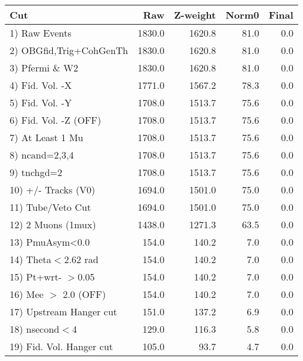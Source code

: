  \begin{table}[h!]\centering
 \begin{tabular}{||l||r|r|r|r||}
 \hline
 \hline
 Cut & Raw & Z-weight & Norm0 & Final \\
 \hline
  1) Raw Events           &      1830.0 &      1620.8 &        81.0 &         0.0 \\
  2) OBGfid,Trig+CohGenTh &      1830.0 &      1620.8 &        81.0 &         0.0 \\
  3) Pfermi \& W2         &      1830.0 &      1620.8 &        81.0 &         0.0 \\
  4) Fid. Vol. -X         &      1771.0 &      1567.2 &        78.3 &         0.0 \\
  5) Fid. Vol. -Y         &      1708.0 &      1513.7 &        75.6 &         0.0 \\
  6) Fid. Vol. -Z (OFF)   &      1708.0 &      1513.7 &        75.6 &         0.0 \\
  7) At Least 1 Mu        &      1708.0 &      1513.7 &        75.6 &         0.0 \\
  8) ncand=2,3,4          &      1708.0 &      1513.7 &        75.6 &         0.0 \\
  9) tnchgd=2             &      1708.0 &      1513.7 &        75.6 &         0.0 \\
 10) +/- Tracks (V0)      &      1694.0 &      1501.0 &        75.0 &         0.0 \\
 11) Tube/Veto Cut        &      1694.0 &      1501.0 &        75.0 &         0.0 \\
 12) 2 Muons (1mux)       &      1438.0 &      1271.3 &        63.5 &         0.0 \\
 13) PmuAsym<0.0          &       154.0 &       140.2 &         7.0 &         0.0 \\
 14) Theta$<$2.62 rad     &       154.0 &       140.2 &         7.0 &         0.0 \\
 15) Pt+wrt- $>$0.05      &       154.0 &       140.2 &         7.0 &         0.0 \\
 16) Mee $>$ 2.0  (OFF)   &       154.0 &       140.2 &         7.0 &         0.0 \\
 17) Upstream Hanger cut  &       151.0 &       137.2 &         6.9 &         0.0 \\
 18) nsecond$<$4          &       129.0 &       116.3 &         5.8 &         0.0 \\
 19) Fid. Vol. Hanger cut &       105.0 &        93.7 &         4.7 &         0.0 \\

\end{tabular}
\end{table}
